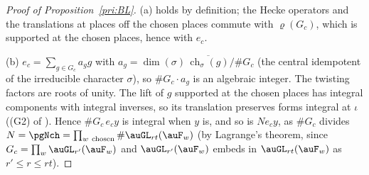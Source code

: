 \documentclass[10pt]{amsart}
\theoremstyle{definition}
\theoremstyle{remark}
\begin{document}
\begin{proof}[Proof of Proposition~\ref{pri:BL}]
(a) holds by definition; the Hecke operators and the translations at places off the chosen places commute with $\varrho(G_c)$, which is supported at the chosen places, hence with $e_c$.

(b) $e_c=\sum_{g\in G_c}a_gg$ with $a_g=\dim(\sigma)\,\overline{\operatorname{ch}_\sigma(g)}/\#G_c$
(the central idempotent of the irreducible character $\sigma$), so $\#G_c\cdot a_g$ is an algebraic
integer. The twisting factors are roots of unity. The lift of $g$ supported at the chosen places has
integral components with integral inverses, so its translation preserves forms integral at $\iota$
((G2) of {\cite[\S6.1]{P49}}). Hence $\#G_c\,e_cy$ is integral when $y$ is, and so is $Ne_cy$, as $\#G_c$
divides $N=\pgNch=\prod_{w\ \mathrm{chosen}}\#\auGL_{rt}(\auF_w)$ (by Lagrange's theorem, since
$G_c=\prod_w\auGL_{r'}(\auF_w)$ and $\auGL_{r'}(\auF_w)$ embeds in $\auGL_{rt}(\auF_w)$ as
$r'\le r\le rt$).


\end{proof}
\end{document}
